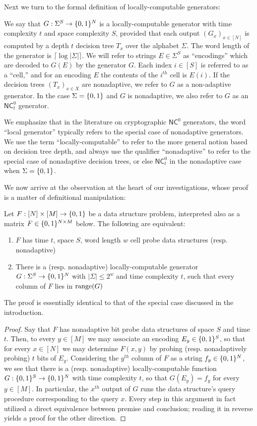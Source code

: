 Next we turn to the formal definition of locally-computable generators:
\begin{definition}
We say that $G: \Sigma^S \to \{0,1\}^N$ is a locally-computable generator with time complexity $t$ and space complexity $S$, provided that each output $(G_x)_{x \in [N]}$ is computed by a depth $t$ decision tree $T_x$ over the alphabet $\Sigma$. The word length of the generator is $\lceil \log |\Sigma|\rceil $. We will refer to strings $E \in \Sigma^S$ as ``encodings'' which are decoded to $G(E)$ by the generator $G$. Each index $i \in [S]$ is referred to as a ``cell,'' and for an encoding $E$ the contents of the $i^{th}$ cell is $E(i)$. 
If the decision trees $(T_x)_{ x\in X}$ are nonadaptive, we refer to $G$ as a non-adaptive generator. In the case $\Sigma = \{0,1\}$ and $G$ is nonadaptive, we also refer to $G$ as an $\mathsf{NC}^0_t$ generator.
\end{definition} 
We emphasize that in the literature on cryptographic $\mathsf{NC}^0$ generators, the word ``local generator'' typically refers to the special case of nonadaptive generators. We use the term ``locally-computable'' to refer to the more general notion based on decision tree depth, and always use the qualifier ``nonadaptive'' to refer to the special case of nonadaptive decision trees, or else $\mathsf{NC}^0_t$ in the nonadaptive case when $\Sigma = \{0,1\}$.

We now arrive at the observation at the heart of our investigations, whose proof is a matter of definitional manipulation:
\begin{observation}\label{cellprobe:obs:main-correspondence}
Let $F: [N] \times [M] \to \{0,1\}$ be a data structure problem, interpreted also as a matrix $F \in \{0,1\}^{N \times M}$ below. The following are equivalent:
\begin{enumerate}
    \item $F$ has time $t$, space $S$, word length $w$ cell probe data structures (resp. nonadaptive)
    \item There is a (resp. nonadaptive) locally-computable generator $G: \Sigma^S \to \{0,1\}^N$ with $|\Sigma|\leq 2^w$ and time complexity $t$, such that every column of $F$ lies in $\mathrm{range}(G)$
\end{enumerate}  
\end{observation}
The proof is essentially identical to that of the special case discussed in the introduction.
\begin{proof}
Say that $F$ has nonadaptive bit probe data structures of space $S$ and time $t$. Then, to every $y \in [M]$ we may associate an encoding $E_y \in \{0,1\}^S$, so that for every $x \in [N]$ we may determine $F(x,y)$ by probing (resp. nonadaptively probing) $t$ bits of $E_y$. Considering the $y^{th}$ column of $F$ as a string $f_y\in \{0,1\}^N$, we see that there is a (resp. nonadaptive) locally-computable function $G: \{0,1\}^S \to \{0,1\}^N$ with time complexity $t$, so that $G(E_y) = f_y$ for every $y\in [M]$. In particular, the $x^{th}$ output of $G$ runs the data structure's query procedure corresponding to the query $x$. Every step in this argument in fact utilized a direct equivalence between premise and conclusion; reading it in reverse yields a proof for the other direction.
\end{proof}


